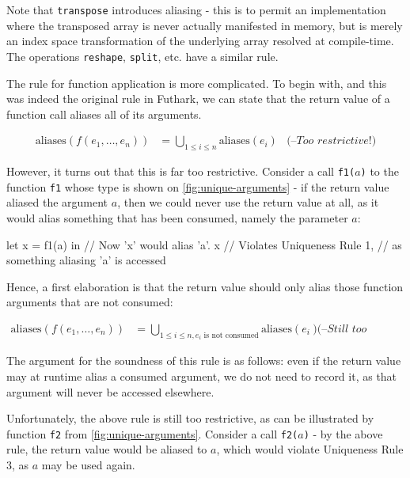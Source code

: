\documentclass[oneside]{memoir}
\newcommand\aliases[1]{\textrm{aliases}(#1)}
\begin{document}
Note that \texttt{transpose} introduces aliasing - this is to permit
an implementation where the transposed array is never actually
manifested in memory, but is merely an index space transformation of
the underlying array resolved at compile-time.  The operations
\texttt{reshape}, \texttt{split}, etc. have a similar rule.

The rule for function application is more complicated.  To begin with,
and this was indeed the original rule in Futhark, we can state that the
return value of a function call aliases all of its arguments.

\begin{align*}
  \aliases{\textit{f}(e_{1}, \ldots, e_{n})} &= \bigcup_{1 \leq i \leq n} \aliases{e_{i}} & \textit{(--Too restrictive!)}
\end{align*}

However, it turns out that this is far too restrictive.  Consider a
call \texttt{f1($a$)} to the function \texttt{f1} whose type is shown
on \cref{fig:unique-arguments} - if the return value aliased the
argument $a$, then we could never use the return value at all, as it
would alias something that has been consumed, namely the parameter
$a$:

\begin{colorcode}
let x = f1(a) in // Now 'x' would alias 'a'.
x                // Violates Uniqueness Rule 1,
                 // as something aliasing 'a' is accessed
\end{colorcode}

Hence, a first elaboration is that the return value should only alias
those function arguments that are not consumed:

\begin{align*}
  \aliases{\textit{f}(e_{1}, \ldots, e_{n})} &= \bigcup_{1 \leq i \leq n, \text{$e_{i}$ is not consumed}} \aliases{e_{i}}  & \textit{(--Still too restrictive!)}
\end{align*}

The argument for the soundness of this rule is as follows: even if the
return value may at runtime alias a consumed argument, we do not need
to record it, as that argument will never be accessed elsewhere.

Unfortunately, the above rule is still too restrictive, as can be
illustrated by function \texttt{f2} from \cref{fig:unique-arguments}.
Consider a call \texttt{f2($a$)} - by the above rule, the return value
would be aliased to $a$, which would violate Uniqueness Rule 3, as $a$
may be used again.
\end{document}
